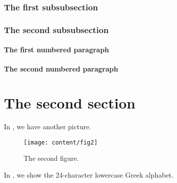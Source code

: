 \blah

\subsubsection{The first subsubsection}

\blah

\subsubsection{The second subsubsection}

\blah

\paragraph{The first numbered paragraph}

\blah

\paragraph{The second numbered paragraph}

\blah

\section{The second section}

\blah

\blah

\blah

\blah

In , we have another picture.

\blah

\begin{figure}[b]
    \centerline{\texttt{[image: content/fig2]}}
    \caption{The second figure.}%
\end{figure}

\blah

In , we show the 24-character lowercase Greek alphabet.

\blah

\blah

